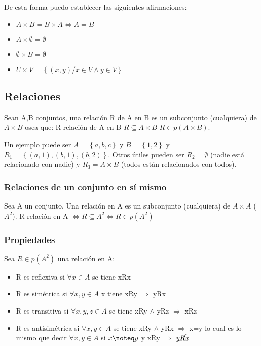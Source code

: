 \documentclass{article}
\begin{document}
De esta forma puedo establecer las siguientes afirmaciones: \begin{itemize}
    \item \begin{math}
        A \times B = B \times A \iff A=B
    \end{math}
    \item \begin{math}
        A \times \emptyset = \emptyset
    \end{math}
    \item \begin{math}
        \emptyset \times B = \emptyset
    \end{math}
    \item \begin{math}
        U \times V = \left\{(x,y)/x\in V \land y \in V \right\}
    \end{math}
\end{itemize}

\subsection{Relaciones}
Sean A,B conjuntos, una relación R de A en B es un subconjunto (cualquiera) de $A \times B$ osea que: R relación de A en B \iff $R \subseteq A\times B$ \iff $R \in p(A\times B)$.

Un ejemplo puede ser $A=\left\{a,b,c\right\}$ y $B=\left\{1,2\right\}$ y $R_1 = \left\{(a,1),(b,1),(b,2)\right\}$. Otros útiles pueden ser $R_2 = \emptyset$ (nadie está relacionado con nadie) y $R_3 = A\times B$ (todos están relacionados con todos).

\subsubsection{Relaciones de un conjunto en sí mismo}

Sea A un conjunto. Una relación en A es un subconjunto (cualquiera) de $A\times A$ ($A^2$). R relación en A $\iff R \subseteq A^2 \iff R \in p(A^2)$

\subsubsection{Propiedades}
Sea $R \in p(A^2)$ una relación en A:\begin{itemize}
    \item R es reflexiva si $\forall x \in A$ se tiene xRx
    \item R es simétrica si $\forall x, y \in A$ x tiene xRy $\Rightarrow$ yRx
    \item R es transitiva si $\forall x,y,z \in A$ se tiene xRy $\land$ yRz $\Rightarrow$ xRz
    \item R es antisimétrica si $\forall x,y \in A$ se tiene xRy $\land$ yRx $\Rightarrow$ x=y lo cual es lo mismo que decir $\forall x,y \in A$ si $x \noteq y$ y xRy $\Rightarrow$ $y \cancel{R} x$
\end{itemize}
\end{document}
